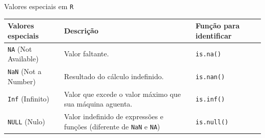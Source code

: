 \documentclass[
  10pt,
  ignorenonframetext,
]{beamer}
\begin{document}
\begin{frame}[fragile]{Valores especiais em \texttt{R}}
\protect\hypertarget{valores-especiais-em-r}{}
\begin{longtable}[]{@{}lll@{}}
\toprule
\begin{minipage}[b]{0.25\columnwidth}\raggedright
Valores especiais\strut
\end{minipage} & \begin{minipage}[b]{0.29\columnwidth}\raggedright
Descrição\strut
\end{minipage} & \begin{minipage}[b]{0.38\columnwidth}\raggedright
Função para identificar\strut
\end{minipage}\tabularnewline
\midrule
\endhead
\begin{minipage}[t]{0.25\columnwidth}\raggedright
\texttt{NA} (Not Available)\strut
\end{minipage} & \begin{minipage}[t]{0.29\columnwidth}\raggedright
Valor faltante.\strut
\end{minipage} & \begin{minipage}[t]{0.38\columnwidth}\raggedright
\texttt{is.na()}\strut
\end{minipage}\tabularnewline
\begin{minipage}[t]{0.25\columnwidth}\raggedright
\texttt{NaN} (Not a Number)\strut
\end{minipage} & \begin{minipage}[t]{0.29\columnwidth}\raggedright
Resultado do cálculo indefinido.\strut
\end{minipage} & \begin{minipage}[t]{0.38\columnwidth}\raggedright
\texttt{is.nan()}\strut
\end{minipage}\tabularnewline
\begin{minipage}[t]{0.25\columnwidth}\raggedright
\texttt{Inf} (Infinito)\strut
\end{minipage} & \begin{minipage}[t]{0.29\columnwidth}\raggedright
Valor que excede o valor máximo que sua máquina aguenta.\strut
\end{minipage} & \begin{minipage}[t]{0.38\columnwidth}\raggedright
\texttt{is.inf()}\strut
\end{minipage}\tabularnewline
\begin{minipage}[t]{0.25\columnwidth}\raggedright
\texttt{NULL} (Nulo)\strut
\end{minipage} & \begin{minipage}[t]{0.29\columnwidth}\raggedright
Valor indefinido de expressões e funções (diferente de \texttt{NaN} e
\texttt{NA})\strut
\end{minipage} & \begin{minipage}[t]{0.38\columnwidth}\raggedright
\texttt{is.null()}\strut
\end{minipage}\tabularnewline
\bottomrule
\end{longtable}
\end{frame}
\end{document}
